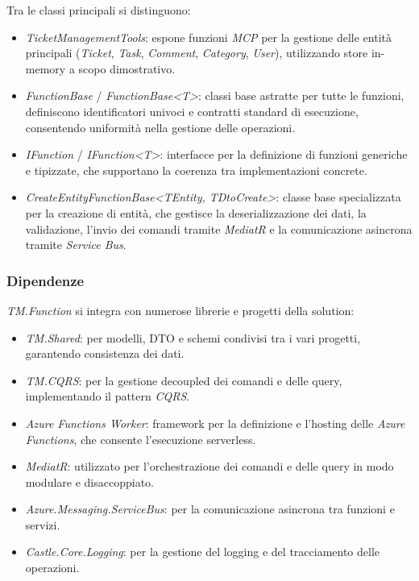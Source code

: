 Tra le classi principali si distinguono:
\begin{itemize}
\item \textit{TicketManagementTools}: espone funzioni \textit{MCP} per la gestione delle entità principali (\textit{Ticket}, \textit{Task}, \textit{Comment}, \textit{Category}, \textit{User}), utilizzando store in-memory a scopo dimostrativo.

\item \textit{FunctionBase} / \textit{FunctionBase<T>}: classi base astratte per tutte le funzioni, definiscono identificatori univoci e contratti standard di esecuzione, consentendo uniformità nella gestione delle operazioni.

\item \textit{IFunction} / \textit{IFunction<T>}: interfacce per la definizione di funzioni generiche e tipizzate, che supportano la coerenza tra implementazioni concrete.

\item \textit{CreateEntityFunctionBase<TEntity, TDtoCreate>}: classe base specializzata per la creazione di entità, che gestisce la deserializzazione dei dati, la validazione, l'invio dei comandi tramite \textit{MediatR} e la comunicazione asincrona tramite \textit{Service Bus}.
\end{itemize}

\subsubsection{Dipendenze}

\textit{TM.Function} si integra con numerose librerie e progetti della solution:

\begin{itemize}
\item \textit{TM.Shared}: per modelli, DTO e schemi condivisi tra i vari progetti, garantendo consistenza dei dati.

\item \textit{TM.CQRS}: per la gestione decoupled dei comandi e delle query, implementando il pattern \textit{CQRS}.

\item \textit{Azure Functions Worker}: framework per la definizione e l'hosting delle \textit{Azure Functions}, che consente l'esecuzione serverless.

\item \textit{MediatR}: utilizzato per l'orchestrazione dei comandi e delle query in modo modulare e disaccoppiato.

\item \textit{Azure.Messaging.ServiceBus}: per la comunicazione asincrona tra funzioni e servizi.

\item \textit{Castle.Core.Logging}: per la gestione del logging e del tracciamento delle operazioni.
\end{itemize}

